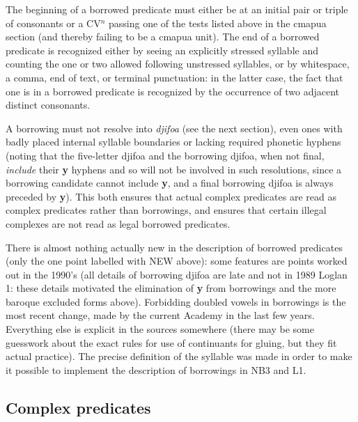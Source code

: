 \documentclass[12pt]{book}
\begin{document}
The beginning of a borrowed predicate must either be at an initial pair or triple of consonants or a CV$^n$ passing one of the tests listed above in the cmapua section (and thereby failing to be a cmapua unit).  The end of a borrowed predicate is recognized either by seeing an explicitly stressed syllable and counting the one or two allowed following unstressed syllables, or by whitespace, a comma, end of text, or terminal punctuation:  in the latter case, the fact that one is in a borrowed predicate is recognized
by the occurrence of two adjacent distinct consonants.

A borrowing must not resolve into {\em djifoa} (see the next section), even ones with badly placed internal syllable boundaries or lacking required phonetic hyphens (noting that the five-letter djifoa and the borrowing djifoa, when not final, {\em include} their {\bf y} hyphens and so will not be involved in such resolutions, since a borrowing candidate cannot include {\bf y}, and a final borrowing djifoa is always preceded by {\bf y}).  This both ensures that actual complex predicates are read as complex predicates rather than borrowings, and ensures that certain illegal complexes are not read as legal borrowed predicates.

There is almost nothing actually new in the description of borrowed predicates (only the one point labelled with NEW above):  some features are points worked out in the 1990's (all details of borrowing djifoa are late and not in 1989 Loglan 1:  these details motivated the elimination of {\bf y} from borrowings and the more baroque excluded forms above).  Forbidding doubled vowels in borrowings is the most recent change, made by the current Academy in the last few years.
Everything else is explicit in the sources somewhere (there may be some guesswork about the exact rules for use of continuants for gluing, but they fit actual practice).  The precise definition of the syllable was made in order to make it possible to implement the description of borrowings in NB3 and L1.

\subsection{Complex predicates}
\end{document}
